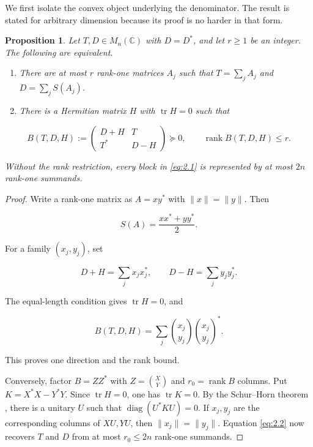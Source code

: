 \documentclass[11pt]{article}
\newtheorem{proposition}[theorem]{Proposition}
\begin{document}
We first isolate the convex object underlying the denominator. The result is stated
for arbitrary dimension because its proof is no harder in that form.

\begin{proposition}
\label{prop:balanced-block}
Let $T,D\in M_n(\mathbb C)$ with $D=D^*$, and let $r\ge1$ be
an integer.
The following are equivalent.

\begin{enumerate}
\item There are at most $r$ rank-one matrices $A_j$ such that
$T=\sum_jA_j$ and $D=\sum_jS(A_j)$.
\item There is a Hermitian matrix $H$ with $\operatorname{tr}H=0$ such that

\end{enumerate}

\[
B(T,D,H):=
\begin{pmatrix}D+H&T\\T^*&D-H\end{pmatrix}\succeq0,
\qquad \operatorname{rank}B(T,D,H)\le r.
\tag{2.1}\label{eq:2.1}
\]

Without the rank restriction, every block in \eqref{eq:2.1} is represented by at most
$2n$ rank-one summands.

\end{proposition}

\begin{proof}
Write a rank-one matrix as $A=xy^*$ with $\|x\|=\|y\|$. Then

\[
S(A)=\frac{xx^*+yy^*}{2}.
\tag{2.2}\label{eq:2.2}
\]

For a family $(x_j,y_j)$, set

\[
D+H=\sum_jx_jx_j^*,\qquad D-H=\sum_jy_jy_j^*.
\]

The equal-length condition gives $\operatorname{tr}H=0$, and

\[
B(T,D,H)=\sum_j
\binom{x_j}{y_j}\binom{x_j}{y_j}^*.
\]

This proves one direction and the rank bound.

Conversely, factor $B=ZZ^*$ with $Z=\binom XY$ and $r_0=\operatorname{rank}B$
columns. Put $K=X^*X-Y^*Y$. Since $\operatorname{tr}H=0$, one has
$\operatorname{tr}K=0$. By the Schur--Horn theorem \cite{horn}, there is a unitary $U$
such that $\operatorname{diag}(U^*KU)=0$. If $x_j,y_j$ are the corresponding
columns of $XU,YU$, then $\|x_j\|=\|y_j\|$. Equation \eqref{eq:2.2} now recovers $T$
and $D$ from at most $r_0\le2n$ rank-one summands.
\end{proof}
\end{document}
